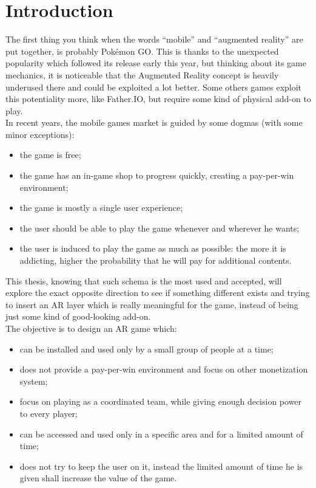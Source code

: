 \chapter{Introduction}
	
	The first thing you think when the words “mobile” and “augmented reality” are put together, is probably Pokémon GO. This is thanks to the unexpected popularity which followed its release early this year, but thinking about its game mechanics, it is noticeable that the Augmented Reality concept is heavily underused there and could be exploited a lot better.
	Some others games exploit this potentiality more, like Father.IO, but require some kind of physical add-on to play. \\
	
	In recent years, the mobile games market is guided by some dogmas (with some minor exceptions):
	\begin{itemize}
		\item the game is free;
		\item the game has an in-game shop to progress quickly, creating a pay-per-win environment;
		\item the game is mostly a single user experience;
		\item the user should be able to play the game whenever and wherever he wants;
		\item the user is induced to play the game as much as possible: the more it is addicting, higher the probability that he will pay for additional contents.
	\end{itemize}
	
	This thesis, knowing that such schema is the most used and accepted, will explore the exact opposite direction to see if something different exists and trying to insert an AR layer which is really meaningful for the game, instead of being just some kind of good-looking add-on. \\
	
	The objective is to design an AR game which: 
	\begin{itemize}
		\item can be installed and used only by a small group of people at a time;
		\item does not provide a pay-per-win environment and focus on other monetization system;
		\item focus on playing as a coordinated team, while giving enough decision power to every player;
		\item can be accessed and used only in a specific area and for a limited amount of time;
		\item does not try to keep the user on it, instead the limited amount of time he is given shall increase the value of the game.
	\end{itemize}
	
